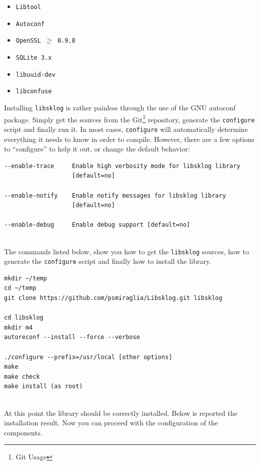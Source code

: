 \documentclass[a4paper,12pt]{article}
\def\libsklog{\texttt{libsklog}\xspace}
\begin{document}
\begin{itemize}
\item \texttt{Libtool}
\item \texttt{Autoconf}
\item \texttt{OpenSSL $\ge$ 0.9.8}
\item \texttt{SQLite 3.x}
\item \texttt{libuuid-dev}
\item \texttt{libconfuse}
\end{itemize}

Installing \libsklog is rather painless through the use of the GNU
autoconf package. Simply get the sources from the Git\footnote{Git
Usage} repository, generate the \texttt{configure} script and
finally run it. In most cases, \texttt{configure} will automatically
determine everything it needs to know in order to compile. However,
there are a few options to ``configure'' to help it out, or change
the default behavior:
\ \\
\begin{lstlisting}
--enable-trace     Enable high verbosity mode for libsklog library
                   [default=no]

--enable-notify    Enable notify messages for libsklog library
                   [default=no]

--enable-debug     Enable debug support [default=no]
\end{lstlisting}
\ \\
The commands listed below, show you how to get the \libsklog sources,
how to generate the \texttt{configure} script and finally how to install
the library.
\ \\
\begin{lstlisting}
mkdir ~/temp
cd ~/temp
git clone https://github.com/psmiraglia/Libsklog.git libsklog

cd libsklog
mkdir m4
autoreconf --install --force --verbose

./configure --prefix=/usr/local [other options]
make
make check
make install (as root)
\end{lstlisting}
\ \\
At this point the library should be correctly installed. Below is
reported the installation result. Now you can proceed with the
configuration of the components.
\ \\
\end{document}
